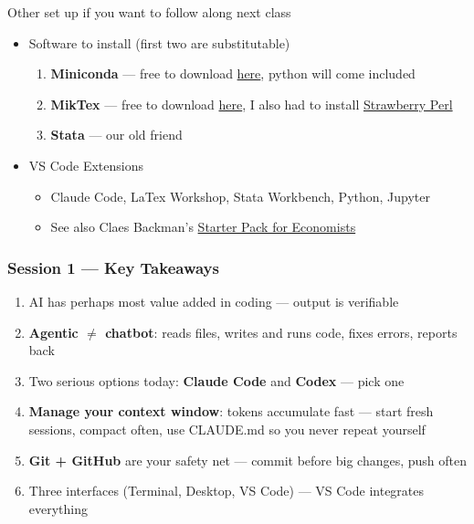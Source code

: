 \documentclass[aspectratio=169, 12pt]{beamer}
\begin{document}
\begin{frame}{Other set up if you want to follow along next class}
    \begin{itemize}
    \item Software to install {\color{gray}(first two are substitutable)}
        \begin{enumerate}
            \item \textbf{Miniconda} --- free to download \href{https://www.anaconda.com/download/success}{here}, python will come included

            \item \textbf{MikTex} --- free to download \href{https://miktex.org/download}{here}, I also had to install \href{https://strawberryperl.com/}{Strawberry Perl}
            \item \textbf{Stata} --- our old friend
        \end{enumerate}\vfill
    \item VS Code Extensions
    \begin{itemize}
        \item Claude Code, LaTex Workshop, Stata Workbench, Python, Jupyter
        \item See also Claes Backman's \href{https://claesbackman.com/claude-code-guide.html\#:~:text=A\%20Starter\%20Pack\%20for\%20Economists}{Starter Pack for Economists}
    \end{itemize}
    \end{itemize}
\end{frame}


\begin{frame}
\frametitle{Session 1 --- Key Takeaways}

\begin{enumerate}
    \item AI has perhaps most value added in coding --- output is verifiable
    \smallskip
    \item \textbf{Agentic $\neq$ chatbot}: reads files, writes and runs code, fixes errors, reports back
    \smallskip
    \item Two serious options today: \textbf{Claude Code} and \textbf{Codex} --- pick one
    \smallskip
    \item \textbf{Manage your context window}: tokens accumulate fast --- start fresh sessions, compact often, use CLAUDE.md so you never repeat yourself
    \smallskip
    \item \textbf{Git + GitHub} are your safety net --- commit before big changes, push often
    \smallskip
    \item Three interfaces (Terminal, Desktop, VS Code) --- VS Code integrates everything
\end{enumerate}

\end{frame}
\end{document}
